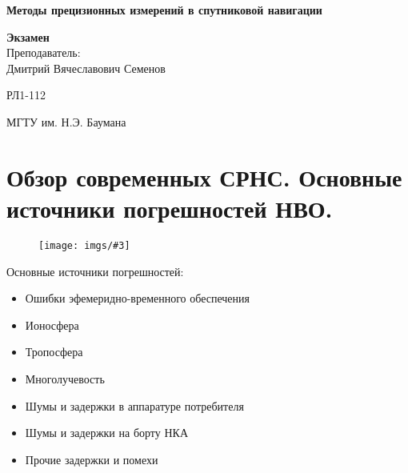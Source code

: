 \documentclass[14pt,a4paper,oneside]{extarticle}
\newcommand{\pic}[3]{
	\begin{figure}[#1]
		\begin{center}
			\texttt{[image: imgs/\#3]}
		\end{center}
	\end{figure}
}
\begin{document}



\begin{titlepage}
    \begin{center}
        \vspace*{1cm}

        \Huge
        \textbf{Методы прецизионных измерений в спутниковой навигации}
        \vspace{1.5cm}

        \vfill
        \Huge
        \textbf{Экзамен}\\
        \vspace{0.5cm}
        \LARGE
        Преподаватель:\\Дмитрий Вячеславович Семенов

        \vspace{1.5cm}

        \vfill

        \LARGE
        РЛ1-112

        \vspace{0.8cm}


        \Large
        МГТУ им. Н.Э. Баумана

    \end{center}
\end{titlepage}

\tableofcontents

\section{Обзор современных СРНС. Основные источники погрешностей НВО.}

\pic{H}{\textwidth}{1}

Основные источники погрешностей:

\begin{itemize}
    \item Ошибки эфемеридно-временного обеспечения
    \item Ионосфера
    \item Тропосфера
    \item Многолучевость
    \item Шумы и задержки в аппаратуре потребителя
    \item Шумы и задержки на борту НКА
    \item Прочие задержки и помехи
\end{itemize}
\end{document}
